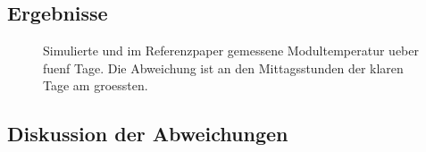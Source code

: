 \subsection{Ergebnisse}

\begin{figure}[htbp]
  \centering
  \caption{Simulierte und im Referenzpaper gemessene Modultemperatur ueber
           fuenf Tage. Die Abweichung ist an den Mittagsstunden der klaren
           Tage am groessten.}
  \label{fig:validierung}
\end{figure}


\subsection{Diskussion der Abweichungen}

